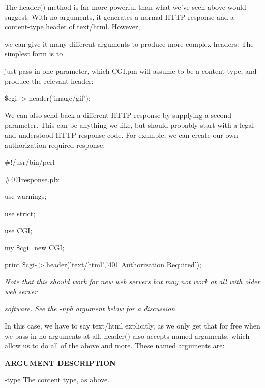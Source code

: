 \documentclass[a4paper,11pt]{book}
\begin{document}
\noindent The header() method  is far  more  powerful  than  what  we've  seen  above  would  suggest.  With no arguments,  it generates a normal  HTTP  response  and  a  content-type  header  of  text/html.  However,

\noindent we can give it many  different  arguments  to  produce  more  complex  headers.  The simplest  form is  to

\noindent just pass in one parameter,  which  CGI.pm will  assume  to  be  a  content  type,  and produce  the relevant header:

\noindent 

\noindent \$cgi-$>$header('image/gif');

\noindent 

\noindent We can also send back a different HTTP response by supplying a second parameter. This can be anything we like, but should probably start with a legal and understood HTTP response code. For example, we can create our own authorization-required response:

\noindent 

\noindent \#!/usr/bin/perl

\noindent \#401response.plx

\noindent use warnings;

\noindent use strict;

\noindent use CGI;

\noindent 

\noindent my \$cgi=new CGI;

\noindent print \$cgi-$>$header('text/html','401 Authorization Required');

\noindent 

\noindent 

\noindent \textit{Note that this should work for new web servers but may not work at all with older web server}

\noindent \textit{software. See the -nph argument below for a discussion.}

\noindent 

\noindent In this case, we have to say text/html explicitly, as we only get that for free when we pass in no arguments at all. header() also accepts named arguments, which allow us to do all of the above and more. These named arguments are:

\noindent 

\noindent \textbf{ARGUMENT DESCRIPTION}

\noindent 

\noindent -type The content type, as above.
\end{document}
